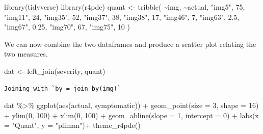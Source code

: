 \documentclass[
  letterpaper,
]{book}
\newenvironment{Shaded}{\begin{snugshade}}{\end{snugshade}}
\newcommand{\AttributeTok}[1]{\textcolor[rgb]{0.40,0.45,0.13}{#1}}
\newcommand{\DecValTok}[1]{\textcolor[rgb]{0.68,0.00,0.00}{#1}}
\newcommand{\FloatTok}[1]{\textcolor[rgb]{0.68,0.00,0.00}{#1}}
\newcommand{\FunctionTok}[1]{\textcolor[rgb]{0.28,0.35,0.67}{#1}}
\newcommand{\NormalTok}[1]{\textcolor[rgb]{0.00,0.23,0.31}{#1}}
\newcommand{\OtherTok}[1]{\textcolor[rgb]{0.00,0.23,0.31}{#1}}
\newcommand{\SpecialCharTok}[1]{\textcolor[rgb]{0.37,0.37,0.37}{#1}}
\newcommand{\StringTok}[1]{\textcolor[rgb]{0.13,0.47,0.30}{#1}}
\begin{document}
\begin{Shaded}
\begin{Highlighting}[]
\FunctionTok{library}\NormalTok{(tidyverse)}
\FunctionTok{library}\NormalTok{(r4pde)}
\NormalTok{quant }\OtherTok{\textless{}{-}} \FunctionTok{tribble}\NormalTok{(}
  \SpecialCharTok{\textasciitilde{}}\NormalTok{img, }\SpecialCharTok{\textasciitilde{}}\NormalTok{actual,}
   \StringTok{"img5"}\NormalTok{,     }\DecValTok{75}\NormalTok{,}
  \StringTok{"img11"}\NormalTok{,     }\DecValTok{24}\NormalTok{,}
  \StringTok{"img35"}\NormalTok{,     }\DecValTok{52}\NormalTok{,}
  \StringTok{"img37"}\NormalTok{,     }\DecValTok{38}\NormalTok{,}
  \StringTok{"img38"}\NormalTok{,     }\DecValTok{17}\NormalTok{,}
  \StringTok{"img46"}\NormalTok{,      }\DecValTok{7}\NormalTok{,}
  \StringTok{"img63"}\NormalTok{,    }\FloatTok{2.5}\NormalTok{,}
  \StringTok{"img67"}\NormalTok{,   }\FloatTok{0.25}\NormalTok{,}
  \StringTok{"img70"}\NormalTok{,     }\DecValTok{67}\NormalTok{,}
  \StringTok{"img75"}\NormalTok{,     }\DecValTok{10}
\NormalTok{  )}
\end{Highlighting}
\end{Shaded}

We can now combine the two dataframes and produce a scatter plot
relating the two measures.

\begin{Shaded}
\begin{Highlighting}[]
\NormalTok{dat }\OtherTok{\textless{}{-}} \FunctionTok{left\_join}\NormalTok{(severity, quant)}
\end{Highlighting}
\end{Shaded}

\begin{verbatim}
Joining with `by = join_by(img)`
\end{verbatim}

\begin{Shaded}
\begin{Highlighting}[]
\NormalTok{dat }\SpecialCharTok{\%\textgreater{}\%}
  \FunctionTok{ggplot}\NormalTok{(}\FunctionTok{aes}\NormalTok{(actual, symptomatic)) }\SpecialCharTok{+}
  \FunctionTok{geom\_point}\NormalTok{(}\AttributeTok{size =} \DecValTok{3}\NormalTok{, }\AttributeTok{shape =} \DecValTok{16}\NormalTok{) }\SpecialCharTok{+}
  \FunctionTok{ylim}\NormalTok{(}\DecValTok{0}\NormalTok{, }\DecValTok{100}\NormalTok{) }\SpecialCharTok{+}
  \FunctionTok{xlim}\NormalTok{(}\DecValTok{0}\NormalTok{, }\DecValTok{100}\NormalTok{) }\SpecialCharTok{+}
  \FunctionTok{geom\_abline}\NormalTok{(}\AttributeTok{slope =} \DecValTok{1}\NormalTok{, }\AttributeTok{intercept =} \DecValTok{0}\NormalTok{) }\SpecialCharTok{+}
  \FunctionTok{labs}\NormalTok{(}\AttributeTok{x =} \StringTok{"Quant"}\NormalTok{,}
       \AttributeTok{y =} \StringTok{"pliman"}\NormalTok{)}\SpecialCharTok{+}
  \FunctionTok{theme\_r4pde}\NormalTok{()}
\end{Highlighting}
\end{Shaded}
\end{document}
